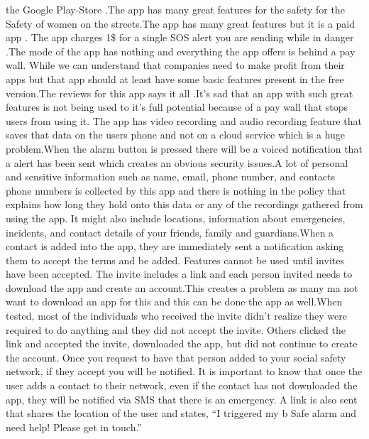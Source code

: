 \documentclass[	DIV=calc,%
							paper=a4,%
							fontsize=12pt,%
							twocolumn]{scrartcl}
\begin{document}
the Google Play-Store .The app has many great features for the safety for the Safety of women on the streets.The app has many great features but it is a paid app . The app charges 1\$ for a single SOS alert you are sending while in danger .The mode of the app has nothing and everything the app offers is behind a pay wall. While we can understand that companies need to make profit from their apps but that app should at least have some basic features present in the free version.The reviews for this app says it all .It's sad that an app with such great features is not being used to it's full potential because of a pay wall that stops users from using it. The app has video recording and audio recording feature that saves that data on the users phone and not on a cloud service which is a huge problem.When the alarm button is pressed there will be a voiced notification that a alert has been sent which creates an obvious security issues.A lot of personal and sensitive information such as name, email, phone number, and contacts phone numbers is collected by this app and there is nothing in the policy that explains how long they hold onto this data or any of the recordings gathered from using the app. It might also include locations, information about emergencies, incidents, and contact details of your friends, family and guardians.When a contact is added into the app, they are immediately sent a notification asking them to accept the terms and be added. Features cannot be used until invites have been accepted. The invite includes a link and each person invited needs to download the app and create an account.This creates a problem as many ma not want to download an app for this and this can be done the app as well.When tested, most of the individuals who received the invite didn't realize they were required to do anything and they did not accept the invite. Others clicked the link and accepted the invite, downloaded the app, but did not continue to create the account. Once you request to have that person added to your social safety network, if they accept you will be notified. It is important to know that once the user adds a contact to their network, even if the contact has not downloaded the app, they will be notified via SMS that there is an emergency. A link is also sent that shares the location of the user and states, “I triggered my b Safe alarm and need help! Please get in touch.”
\vspace{8mm}
\end{document}

